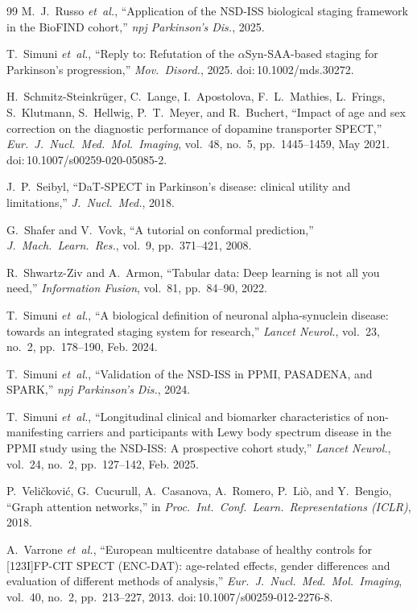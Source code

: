 \documentclass[10pt,letterpaper]{article}
\begin{document}
\begin{thebibliography}{99}
M.~J.~Russo \textit{et~al.}, ``Application of the NSD-ISS biological staging framework in the BioFIND cohort,'' \textit{npj Parkinson's Dis.}, 2025.

T.~Simuni \textit{et~al.}, ``Reply to: Refutation of the $\alpha$Syn-SAA-based staging for Parkinson's progression,'' \textit{Mov.\ Disord.}, 2025. doi:\,10.1002/mds.30272.

H.~Schmitz-Steinkr\"{u}ger, C.~Lange, I.~Apostolova, F.~L.~Mathies, L.~Frings, S.~Klutmann, S.~Hellwig, P.~T.~Meyer, and R.~Buchert, ``Impact of age and sex correction on the diagnostic performance of dopamine transporter SPECT,'' \textit{Eur.\ J.\ Nucl.\ Med.\ Mol.\ Imaging}, vol.~48, no.~5, pp.~1445--1459, May 2021. doi:\,10.1007/s00259-020-05085-2.

J.~P.~Seibyl, ``DaT-SPECT in Parkinson's disease: clinical utility and limitations,'' \textit{J.\ Nucl.\ Med.}, 2018.

G.~Shafer and V.~Vovk, ``A tutorial on conformal prediction,'' \textit{J.\ Mach.\ Learn.\ Res.}, vol.~9, pp.~371--421, 2008.

R.~Shwartz-Ziv and A.~Armon, ``Tabular data: Deep learning is not all you need,'' \textit{Information Fusion}, vol.~81, pp.~84--90, 2022.

T.~Simuni \textit{et~al.}, ``A biological definition of neuronal alpha-synuclein disease: towards an integrated staging system for research,'' \textit{Lancet Neurol.}, vol.~23, no.~2, pp.~178--190, Feb. 2024.

T.~Simuni \textit{et~al.}, ``Validation of the NSD-ISS in PPMI, PASADENA, and SPARK,'' \textit{npj Parkinson's Dis.}, 2024.

T.~Simuni \textit{et~al.}, ``Longitudinal clinical and biomarker characteristics of non-manifesting carriers and participants with Lewy body spectrum disease in the PPMI study using the NSD-ISS: A prospective cohort study,'' \textit{Lancet Neurol.}, vol.~24, no.~2, pp.~127--142, Feb. 2025.

P.~Veli\v{c}kovi\'{c}, G.~Cucurull, A.~Casanova, A.~Romero, P.~Li\`{o}, and Y.~Bengio, ``Graph attention networks,'' in \textit{Proc.\ Int.\ Conf.\ Learn.\ Representations (ICLR)}, 2018.

A.~Varrone \textit{et~al.}, ``European multicentre database of healthy controls for [123I]FP-CIT SPECT (ENC-DAT): age-related effects, gender differences and evaluation of different methods of analysis,'' \textit{Eur.\ J.\ Nucl.\ Med.\ Mol.\ Imaging}, vol.~40, no.~2, pp.~213--227, 2013. doi:\,10.1007/s00259-012-2276-8.


\end{thebibliography}
\end{document}
